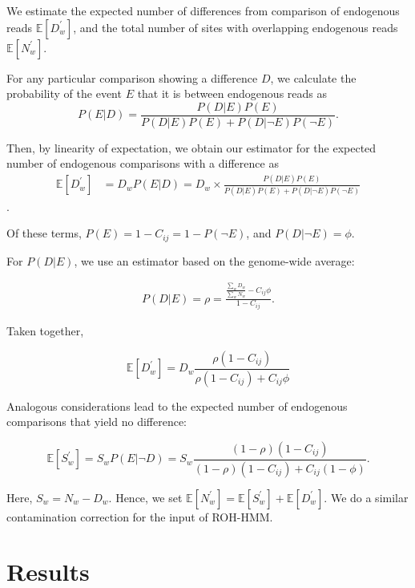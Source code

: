 \documentclass[12pt, letterpaper]{article}
\begin{document}
We  estimate the expected number of differences from comparison of endogenous reads $\mathbb{E}[D_w^{'}]$, and the total number of sites with overlapping endogenous reads $\mathbb{E}[N_w^{'}]$. 

For any particular comparison showing a difference $D$, we calculate the probability of the event $E$ that it is between endogenous reads as 
\begin{equation}
    P(E|D) = \frac{P(D|E)P(E)}{P(D|E)P(E) + P(D| \neg E)P( \neg E)}.
\end{equation}

Then, by linearity of expectation, we obtain our estimator for the expected number of endogenous comparisons with a difference as 
\begin{align}
    \mathbb{E}[D_w^{'}] &= D_{w} P(E|D) = D_{w} \times \frac{P(D|E)P(E)}{P(D|E)P(E) + P(D| \neg E)P( \neg E)}
\end{align}.

Of these terms, $P(E)= 1 -C_{ij} = 1 - P(\neg E)$, and $P(D| \neg E) = \phi$.

For $P(D|E)$, we use an estimator based on the genome-wide average: 

\begin{align}
    P(D|E) = \rho = \frac{\frac{\sum_w D_w}{\sum_w N_w} - C_{ij} \phi}{1 - C_{ij}}.
\end{align}

Taken together, 

\begin{equation}
 \mathbb{E}[D_w^{'}]= D_{w}\frac{\rho (1-C_{ij})}{\rho(1-C_{ij}) + C_{ij}\phi}
 \end{equation}
 
 Analogous considerations lead to the expected number of endogenous comparisons that yield no difference:
 
 \begin{equation}
\mathbb{E}[S_w^{'}] = S_{w} P(E| \neg D) = S_{w} \frac{(1-\rho)(1-C_{ij})}{(1-\rho)(1-C_{ij}) + C_{ij}(1-\phi)}.
 \end{equation}

Here, $S_w = N_w - D_w$. Hence, we set $\mathbb{E}[N_w^{'}] = \mathbb{E}[S_w^{'}] + \mathbb{E}[D_w^{'}]$. We do a similar contamination correction for the input of ROH-HMM.




\section{Results}\label{results}
\end{document}
